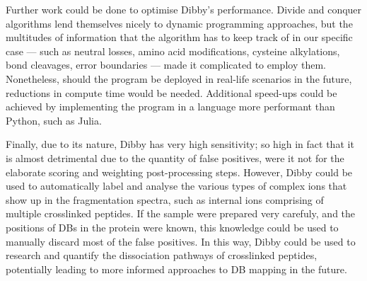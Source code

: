 Further work could be done to optimise Dibby's performance. Divide and conquer algorithms lend themselves nicely to dynamic programming approaches, but the multitudes of information that the algorithm has to keep track of in our specific case --- such as neutral losses, amino acid modifications, cysteine alkylations, bond cleavages, error boundaries --- made it complicated to employ them. Nonetheless, should the program be deployed in real-life scenarios in the future, reductions in compute time would be needed. Additional speed-ups could be achieved by implementing the program in a language more performant than Python, such as Julia.

Finally, due to its nature, Dibby has very high sensitivity; so high in fact that it is almost detrimental due to the quantity of false positives, were it not for the elaborate scoring and weighting post-processing steps. However, Dibby could be used to automatically label and analyse the various types of complex ions that show up in the fragmentation spectra, such as internal ions comprising of multiple crosslinked peptides. If the sample were prepared very carefuly, and the positions of DBs in the protein were known, this knowledge could be used to manually discard most of the false positives. In this way, Dibby could be used to research and quantify the dissociation pathways of crosslinked peptides, potentially leading to more informed approaches to DB mapping in the future.
